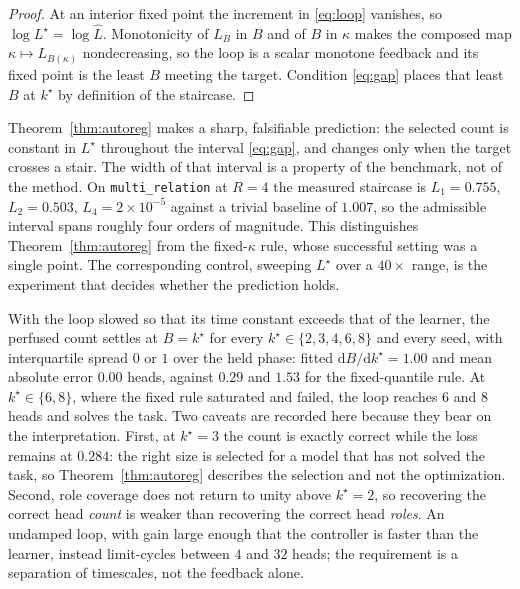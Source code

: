 \begin{proof}
At an interior fixed point the increment in \eqref{eq:loop} vanishes, so
$\log L^\star = \log \widehat{L}$. Monotonicity of $L_B$ in $B$ and of $B$ in $\kappa$
makes the composed map $\kappa \mapsto L_{B(\kappa)}$ nondecreasing, so the loop is a
scalar monotone feedback and its fixed point is the least $B$ meeting the target.
Condition \eqref{eq:gap} places that least $B$ at $k^\star$ by definition of the
staircase.
\end{proof}

\begin{remark}
\label{rem:notuning}
Theorem~\ref{thm:autoreg} makes a sharp, falsifiable prediction: the selected count is
constant in $L^\star$ throughout the interval \eqref{eq:gap}, and changes only when the
target crosses a stair. The width of that interval is a property of the benchmark, not of
the method. On \texttt{multi\_relation} at $R = 4$ the measured staircase is
$L_1 = 0.755$, $L_2 = 0.503$, $L_4 = 2\times 10^{-5}$ against a trivial baseline of
$1.007$, so the admissible interval spans roughly four orders of magnitude. This
distinguishes Theorem~\ref{thm:autoreg} from the fixed-$\kappa$ rule, whose successful
setting was a single point. The corresponding control, sweeping $L^\star$ over a
$40\times$ range, is the experiment that decides whether the prediction holds.
\end{remark}

\begin{remark}
\label{rem:autoreg}
With the loop slowed so that its time constant exceeds that of the learner, the perfused
count settles at $B = k^\star$ for every $k^\star \in \{2,3,4,6,8\}$ and every seed, with
interquartile spread $0$ or $1$ over the held phase: fitted
$\mathrm{d}B/\mathrm{d}k^\star = 1.00$ and mean absolute error $0.00$ heads, against
$0.29$ and $1.53$ for the fixed-quantile rule. At $k^\star \in \{6,8\}$, where the
fixed rule saturated and failed, the loop reaches $6$ and $8$ heads and solves the task.
Two caveats are recorded here because they bear on the interpretation. First, at
$k^\star = 3$ the count is exactly correct while the loss remains at $0.284$: the right
size is selected for a model that has not solved the task, so Theorem~\ref{thm:autoreg}
describes the selection and not the optimization. Second, role coverage does not return
to unity above $k^\star = 2$, so recovering the correct head \emph{count} is weaker than
recovering the correct head \emph{roles}. An undamped loop, with gain large enough that
the controller is faster than the learner, instead limit-cycles between $4$ and $32$
heads; the requirement is a separation of timescales, not the feedback alone.
\end{remark}

